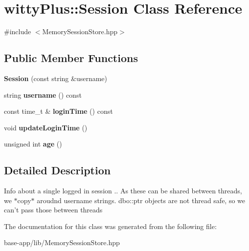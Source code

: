\hypertarget{classwittyPlus_1_1Session}{
\section{wittyPlus::Session Class Reference}
\label{classwittyPlus_1_1Session}
}


{\ttfamily \#include $<$MemorySessionStore.hpp$>$}

\subsection*{Public Member Functions}
\begin{DoxyCompactItemize}
\item 
\hypertarget{classwittyPlus_1_1Session_a57d3e15961bd63127f5e4f7e4e287f7e}{
{\bfseries Session} (const string \&username)}
\label{classwittyPlus_1_1Session_a57d3e15961bd63127f5e4f7e4e287f7e}

\item 
\hypertarget{classwittyPlus_1_1Session_aeaa6abcfe7aba8bb741354f758ff2fa4}{
string {\bfseries username} () const }
\label{classwittyPlus_1_1Session_aeaa6abcfe7aba8bb741354f758ff2fa4}

\item 
\hypertarget{classwittyPlus_1_1Session_a61c8cccb74ff0c01aa2a5e5ea5acd92e}{
const time\_\-t \& {\bfseries loginTime} () const }
\label{classwittyPlus_1_1Session_a61c8cccb74ff0c01aa2a5e5ea5acd92e}

\item 
\hypertarget{classwittyPlus_1_1Session_ade4fca872bdfb9d435760ec063e038c9}{
void {\bfseries updateLoginTime} ()}
\label{classwittyPlus_1_1Session_ade4fca872bdfb9d435760ec063e038c9}

\item 
\hypertarget{classwittyPlus_1_1Session_a0413b7990d8287b4fd6334bc5b1a57fb}{
unsigned int {\bfseries age} ()}
\label{classwittyPlus_1_1Session_a0413b7990d8287b4fd6334bc5b1a57fb}

\end{DoxyCompactItemize}


\subsection{Detailed Description}
Info about a single logged in session .. As these can be shared between threads, we $\ast$copy$\ast$ aroudnd username strings. dbo::ptr objects are not thread safe, so we can't pass those between threads 

The documentation for this class was generated from the following file:\begin{DoxyCompactItemize}
\item 
base-\/app/lib/MemorySessionStore.hpp\end{DoxyCompactItemize}
